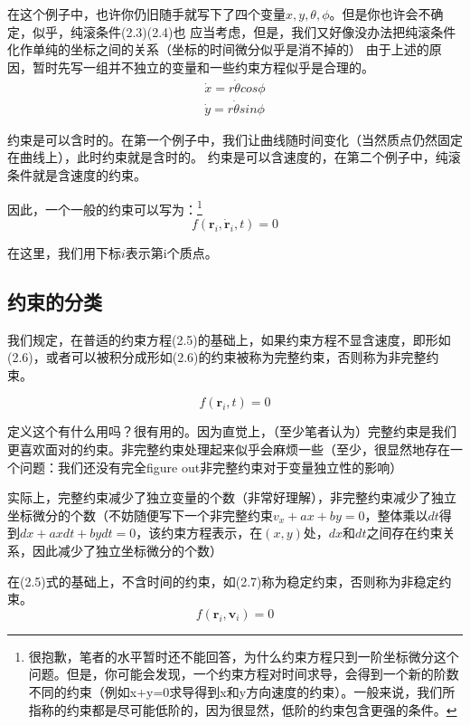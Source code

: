 \documentclass[a4paper, 10pt, openany]{book}%
\begin{document}
在这个例子中，也许你仍旧随手就写下了四个变量$x, y, \theta, \phi$。但是你也许会不确定，似乎，纯滚条件(2.3)(2.4)也
应当考虑，但是，我们又好像没办法把纯滚条件化作单纯的坐标之间的关系（坐标的时间微分似乎是消不掉的）
由于上述的原因，暂时先写一组并不独立的变量和一些约束方程似乎是合理的。
\begin{align}
  \dot{x}=r\dot{\theta}cos\phi \\
  \dot{y}=r\dot{\theta}sin\phi
\end{align}

约束是可以含时的。在第一个例子中，我们让曲线随时间变化（当然质点仍然固定在曲线上），此时约束就是含时的。
约束是可以含速度的，在第二个例子中，纯滚条件就是含速度的约束。

因此，一个一般的约束可以写为：\footnote{很抱歉，笔者的水平暂时还不能回答，为什么约束方程只到一阶坐标微分这个问题。但是，你可能会发现，一个约束方程对时间求导，会得到一个新的阶数不同的约束（例如x+y=0求导得到x和y方向速度的约束）。一般来说，我们所指称的约束都是尽可能低阶的，因为很显然，低阶的约束包含更强的条件。}
\begin{equation}
  f(\textbf{r}_i,\dot{\textbf{r}}_i,t)=0
\end{equation}

在这里，我们用下标$i$表示第i个质点。

  
  \subsection{约束的分类}
  我们规定，在普适的约束方程(2.5)的基础上，如果约束方程不显含速度，即形如(2.6)，或者可以被积分成形如(2.6)的约束被称为完整约束，否则称为非完整约束。
  
  \begin{equation}
    f(\textbf{r}_i,t)=0
  \end{equation}

  定义这个有什么用吗？很有用的。因为直觉上，（至少笔者认为）完整约束是我们更喜欢面对的约束。非完整约束处理起来似乎会麻烦一些（至少，很显然地存在一个问题：我们还没有完全figure out非完整约束对于变量独立性的影响）

  实际上，完整约束减少了独立变量的个数（非常好理解），非完整约束减少了独立坐标微分的个数（不妨随便写下一个非完整约束$v_x+ax+by=0$，整体乘以$dt$得到$dx+axdt+bydt=0$，该约束方程表示，在$(x,y)$处，$dx$和$dt$之间存在约束关系，因此减少了独立坐标微分的个数）
  
  在(2.5)式的基础上，不含时间的约束，如(2.7)称为稳定约束，否则称为非稳定约束。
  \begin{equation}
    f(\textbf{r}_i,\textbf{v}_i)=0
  \end{equation}
\end{document}
